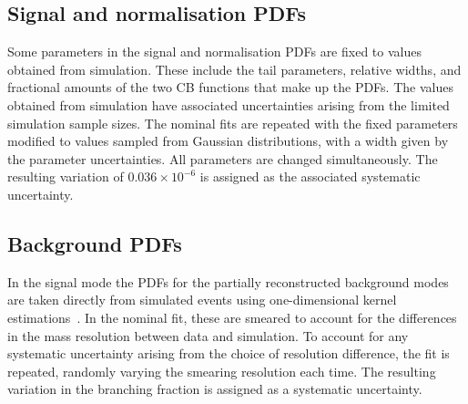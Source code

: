 

\subsection{Signal and normalisation PDFs}

Some parameters in the signal and normalisation PDFs are fixed to values obtained from simulation. These include the tail parameters, relative widths, and fractional amounts of the two CB functions that make up the PDFs. The values obtained from simulation have associated uncertainties arising from the limited simulation sample sizes. The nominal fits are repeated with the fixed parameters modified to values sampled from Gaussian distributions, with a width given by the parameter uncertainties. All parameters are changed simultaneously. The resulting variation of $0.036\times 10^{-6}$ is assigned as the associated systematic uncertainty. 

\subsection{Background PDFs}

In the signal mode the PDFs for the partially reconstructed background modes are taken directly from simulated events using one-dimensional kernel estimations~\cite{Cranmer:2000du}. In the nominal fit, these are smeared to account for the differences in the mass resolution between data and simulation. To account for any systematic uncertainty arising from the choice of resolution difference, the fit is repeated, randomly varying the smearing resolution each time. The resulting variation in the branching fraction is assigned as a systematic uncertainty. 

